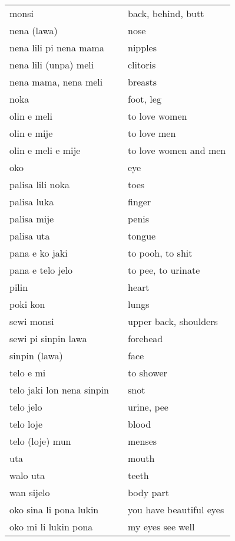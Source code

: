 \begin{supertabular}{p{4,5cm}|ll}
    monsi                     &  & back, behind, butt      \\
    nena (lawa)               &  & nose                    \\
    nena lili pi nena mama    &  & nipples                 \\
    nena lili (unpa) meli     &  & clitoris                \\
    nena mama, nena meli      &  & breasts                 \\
    noka                      &  & foot, leg               \\
    olin e meli               &  & to love women           \\
    olin e mije               &  & to love men             \\
    olin e meli e mije        &  & to love women and men   \\
    oko                       &  & eye                     \\
    palisa lili noka          &  & toes                    \\
    palisa luka               &  & finger                  \\
    palisa mije               &  & penis                   \\
    palisa uta                &  & tongue                  \\
    pana e ko jaki            &  & to pooh, to shit        \\
    pana e telo jelo          &  & to pee, to urinate      \\
    pilin                     &  & heart                   \\
    poki kon                  &  & lungs                   \\
    sewi monsi                &  & upper back, shoulders   \\
    sewi pi sinpin lawa       &  & forehead                \\
    sinpin (lawa)             &  & face                    \\
    telo e mi                 &  & to shower               \\
    telo jaki lon nena sinpin &  & snot                    \\
    telo jelo                 &  & urine, pee              \\
    telo loje                 &  & blood                   \\
    telo (loje) mun           &  & menses                  \\
    uta                       &  & mouth                   \\
    walo uta                  &  & teeth                   \\
    wan sijelo                &  & body part               \\
    oko sina li pona lukin    &  & you have beautiful eyes \\
    oko mi li lukin pona      &  & my eyes see well        \\
\end{supertabular} \\
